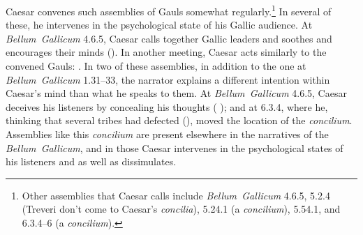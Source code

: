 \documentclass[12pt,letterpaper,oneside,final]{memoir}
\begin{document}
Caesar convenes such assemblies of Gauls somewhat regularly.\footnote{Other assemblies that Caesar calls include \emph{Bellum~Gallicum} 4.6.5, 5.2.4 (Treveri don't come to Caesar's \emph{concilia}), 5.24.1 (a \emph{concilium}), 5.54.1, and 6.3.4--6 (a \emph{concilium}).} In several of these, he intervenes in the psychological state of his Gallic audience. At \emph{Bellum~Gallicum} 4.6.5, Caesar calls together Gallic leaders and soothes and encourages their minds (). In another meeting, Caesar acts similarly to the convened Gauls: . In two of these assemblies, in addition to the one at \emph{Bellum~Gallicum} 1.31--33, the narrator explains a different intention within Caesar's mind than what he speaks to them. At \emph{Bellum~Gallicum} 4.6.5, Caesar deceives his listeners by concealing his thoughts ( ); and at 6.3.4, where he, thinking that several tribes had defected (), moved the location of the \emph{concilium}. Assemblies like this \emph{concilium} are present elsewhere in the narratives of the \emph{Bellum~Gallicum}, and in those Caesar intervenes in the psychological states of his listeners and as well as dissimulates.
\end{document}
